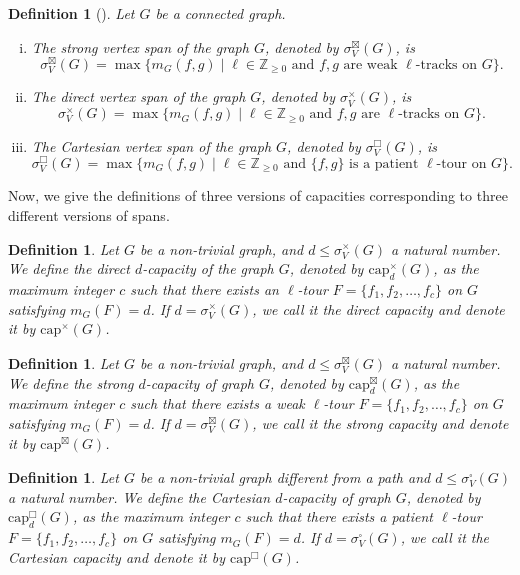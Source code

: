 \documentclass{article}
\newtheorem{definition}[theorem]{Definition}
\newcommand{\dcap}[2]{\mathrm{cap}^{\times}_{#1}(#2)}
\newcommand{\scap}[2]{\mathrm{cap}^{\boxtimes}_{#1}(#2)}
\newcommand{\ccap}[2]{\mathrm{cap}^{\mathbin{\Box}}_{#1}(#2)}
\DeclareMathOperator{\BoxProduct}{\mathbin{\Box}}
\newcommand{\svSpan}[1]{\sigma^{\boxtimes}_V(#1)}
\newcommand{\dvSpan}[1]{\sigma^{\times}_V(#1)}
\newcommand{\cvSpan}[1]{\sigma^{\BoxProduct}_V(#1)}
\begin{document}
\begin{definition}[\cite{BaTa23, Erceg23}]\label{def:allSpans}
Let $G$ be a connected graph. 
\begin{enumerate}[(i)]
    \item The \emph{strong vertex span} of the graph $G$, denoted by $\svSpan{G}$, is $$\svSpan{G} = \max \{ m_G(f,g)  \mid  \ell\in \mathbb{Z}_{\ge 0} \text{ and } f,g \text{ are weak $\ell$-tracks on $G$} \}.$$
    \item The \emph{direct vertex span} of the graph $G$, denoted by $\dvSpan{G}$, is $$\dvSpan{G} = \max \{ m_G(f,g)  \mid  \ell\in \mathbb{Z}_{\ge 0} \text{ and } f,g \text{ are $\ell$-tracks on $G$} \}.$$
    \item The \emph{Cartesian vertex span} of the graph $G$, denoted by $\cvSpan{G}$, is $$\cvSpan{G} = \max \{ m_G(f,g)  \mid  \ell\in \mathbb{Z}_{\ge 0} \text{ and } \{f,g\} \text{ is a patient $\ell$-tour on $G$} \}.$$
\end{enumerate}
 \end{definition}

Now, we give the definitions of three versions of capacities corresponding to three different versions of spans. 

\begin{definition}\label{def:direct-capacity}
    Let $G$ be a non-trivial graph, and $d \leq \sigma^\times_V(G)$ a natural number. We define the \emph{direct $d$-capacity} of the graph $G$, denoted by $\dcap{d}{G}$, as the maximum integer $c$ such that there exists an 
    $\ell$-tour $F=\{f_1,f_2,\ldots,f_c\}$ on $G$ satisfying $m_G(F)=d$.
    If $d=\sigma^\times_V(G)$, we call it the \emph{direct capacity} and denote it by $\dcap{}{G}$.
\end{definition}

\begin{definition}\label{def:strong-capacity}
    Let $G$ be a non-trivial graph, and $d \leq \sigma^\boxtimes_V(G)$ a natural number. We define the \emph{strong $d$-capacity} of graph $G$, denoted by $\scap{d}{G}$, as the maximum integer $c$ such that there exists a weak $\ell$-tour $F=\{f_1,f_2,\ldots,f_c\}$ on $G$ satisfying $m_G(F)= d$.
    If $d=\sigma^\boxtimes_V(G)$, we call it the \emph{strong capacity} and denote it by $\scap{}{G}$.
\end{definition}

\begin{definition}\label{def:Cartesian-capacity}
    Let $G$ be a non-trivial graph different from a path and $d \leq \sigma^\square_V(G)$ a natural number. We define the \emph{Cartesian $d$-capacity} of graph $G$, denoted by $\ccap{d}{G}$, as the maximum integer $c$ such that there exists a patient $\ell$-tour $F=\{f_1,f_2,\ldots,f_c\}$ on $G$ satisfying $m_G(F)= d$.
    If $d=\sigma^\square_V(G)$, we call it the \emph{Cartesian capacity} and denote it by $\ccap{}{G}$.
\end{definition}
\end{document}
